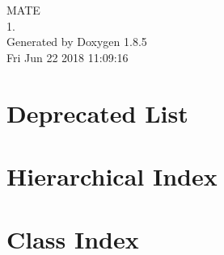 \documentclass[twoside]{book}
\newcommand{\clearemptydoublepage}{%
  \newpage{\pagestyle{empty}\cleardoublepage}%
}
\begin{document}
\hypersetup{pageanchor=false}
\begin{titlepage}
\vspace*{7cm}
\begin{center}%
{\Large M\-A\-T\-E \\[1ex]\large 1. }\\
\vspace*{1cm}
{\large Generated by Doxygen 1.8.5}\\
\vspace*{0.5cm}
{\small Fri Jun 22 2018 11:09:16}\\
\end{center}
\end{titlepage}
\clearemptydoublepage
\tableofcontents
\clearemptydoublepage
{}
\hypersetup{pageanchor=true}

\chapter{Deprecated List}
\label{deprecated}
\hypertarget{deprecated}{}

\chapter{Hierarchical Index}

\chapter{Class Index}

\end{document}
